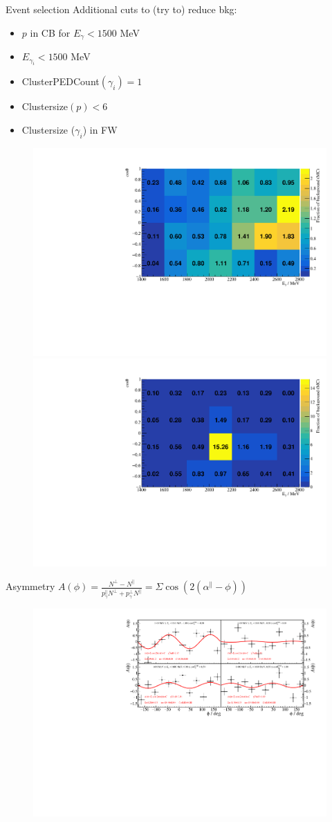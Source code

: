 \documentclass[11pt,aspectratio=169,dvipsnames]{beamer}
\begin{document}
\begin{frame}{Event selection}
	Additional cuts to (try to) reduce bkg: 
	\begin{itemize}
		\item $p$ in CB for $E_\gamma<1500$ MeV
		\item $E_{\gamma_{i}}<1500$ MeV
		\item ClusterPEDCount$(\gamma_i)=1$
		\item Clustersize$(p)<6$
		\item Clustersize ($\gamma_{i}$) in FW
	\end{itemize}
	\begin{figure}
		\centering
		\includegraphics[width=.49\linewidth]{../../figs/hydrogen/bin_cuts/invcut_bkg_percentage.pdf}
		\includegraphics[width=.49\linewidth]{../../figs/hydrogen/bin_cuts_alt/invcut_bkg_percentage.pdf}
	\end{figure}
\end{frame}
\begin{frame}{Asymmetry $A(\phi)=\frac{N^\bot-N^\parallel}{p_\gamma^\parallel N^\bot+p_\gamma^\bot N^\parallel}=\Sigma \cos\left(2\left(\alpha^\parallel-\phi\right)\right)$ }
	\begin{figure}
		\includegraphics[width=\linewidth]{../../figs/hydrogen/asymmetry/ebin_0_alt_fixalphaC.pdf}
	\end{figure}
\end{frame}
\end{document}
